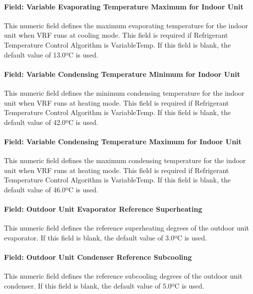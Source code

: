 \paragraph{Field: Variable Evaporating Temperature Maximum for Indoor Unit}

This numeric field defines the maximum evaporating temperature for the indoor unit when VRF runs at cooling mode. This field is required if Refrigerant Temperature Control Algorithm is VariableTemp. If this field is blank, the default value of 13.0ºC is used.

\paragraph{Field: Variable Condensing Temperature Minimum for Indoor Unit}

This numeric field defines the minimum condensing temperature for the indoor unit when VRF runs at heating mode. This field is required if Refrigerant Temperature Control Algorithm is VariableTemp. If this field is blank, the default value of 42.0ºC is used.

\paragraph{Field: Variable Condensing Temperature Maximum for Indoor Unit}

This numeric field defines the maximum condensing temperature for the indoor unit when VRF runs at heating mode. This field is required if Refrigerant Temperature Control Algorithm is VariableTemp. If this field is blank, the default value of 46.0ºC is used.

\paragraph{Field: Outdoor Unit Evaporator Reference Superheating}

This numeric field defines the reference superheating degrees of the outdoor unit evaporator. If this field is blank, the default value of 3.0ºC is used.

\paragraph{Field: Outdoor Unit Condenser Reference Subcooling}

This numeric field defines the reference subcooling degrees of the outdoor unit condenser. If this field is blank, the default value of 5.0ºC is used.

